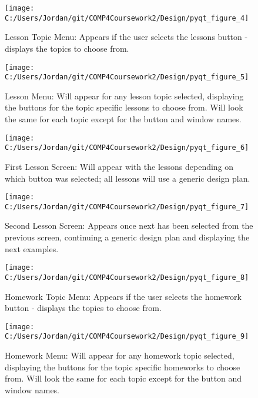 \begin{figure}[H]
    \label{fig:print_function_result}\caption{Lesson Topic Menu: Appears if the user selects the lessons button - displays the topics to choose from.}
    \texttt{[image: C:/Users/Jordan/git/COMP4Coursework2/Design/pyqt\_figure\_4]}
\end{figure}

\begin{figure}[H]
    \label{fig:print_function_result}\caption{Lesson Menu: Will appear for any lesson topic selected, displaying the buttons for the topic specific lessons to choose from. Will look the same for each topic except for the button and window names.}
    \texttt{[image: C:/Users/Jordan/git/COMP4Coursework2/Design/pyqt\_figure\_5]}
\end{figure}

\begin{figure}[H]
    \label{fig:print_function_result}\caption{First Lesson Screen: Will appear with the lessons depending on which button was selected; all lessons will use a generic design plan.}
    \texttt{[image: C:/Users/Jordan/git/COMP4Coursework2/Design/pyqt\_figure\_6]}
\end{figure}

\begin{figure}[H]
    \label{fig:print_function_result}\caption{Second Lesson Screen: Appears once next has been selected from the previous screen, continuing a generic design plan and displaying the next examples.}
    \texttt{[image: C:/Users/Jordan/git/COMP4Coursework2/Design/pyqt\_figure\_7]}
\end{figure}

\begin{figure}[H]
    \label{fig:print_function_result}\caption{Homework Topic Menu: Appears if the user selects the homework button - displays the topics to choose from.}
    \texttt{[image: C:/Users/Jordan/git/COMP4Coursework2/Design/pyqt\_figure\_8]}
\end{figure}

\begin{figure}[H]
    \label{fig:print_function_result}\caption{Homework Menu: Will appear for any homework topic selected, displaying the buttons for the topic specific homeworks to choose from. Will look the same for each topic except for the button and window names.}
    \texttt{[image: C:/Users/Jordan/git/COMP4Coursework2/Design/pyqt\_figure\_9]}
\end{figure}

